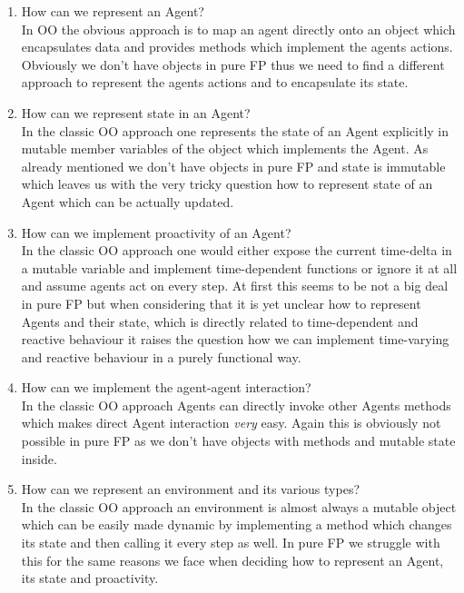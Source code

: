 \begin{enumerate}
	\item How can we represent an Agent? \\
	In OO the obvious approach is to map an agent directly onto an object which encapsulates data and provides methods which implement the agents actions. Obviously we don't have objects in pure FP thus we need to find a different approach to represent the agents actions and to encapsulate its state.
	
	\item How can we represent state in an Agent? \\
	In the classic OO approach one represents the state of an Agent explicitly in mutable member variables of the object which implements the Agent. As already mentioned we don't have objects in pure FP and state is immutable which leaves us with the very tricky question how to represent state of an Agent which can be actually updated.
	
	\item How can we implement proactivity of an Agent? \\
	In the classic OO approach one would either expose the current time-delta in a mutable variable and implement time-dependent functions or ignore it at all and assume agents act on every step. At first this seems to be not a big deal in pure FP but when considering that it is yet unclear how to represent Agents and their state, which is directly related to time-dependent and reactive behaviour it raises the question how we can implement time-varying and reactive behaviour in a purely functional way.
	
	\item How can we implement the agent-agent interaction? \\
	In the classic OO approach Agents can directly invoke other Agents methods which makes direct Agent interaction \textit{very} easy. Again this is obviously not possible in pure FP as we don't have objects with methods and mutable state inside.
		
	\item How can we represent an environment and its various types? \\
	In the classic OO approach an environment is almost always a mutable object which can be easily made dynamic by implementing a method which changes its state and then calling it every step as well. In pure FP we struggle with this for the same reasons we face when deciding how to represent an Agent, its state and proactivity.
	

\end{enumerate}
